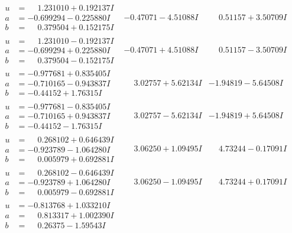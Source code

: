 \documentclass[1p]{elsarticle_modified}
\theoremstyle{definition}
\begin{document}
$$\begin{array}{c|c|c}
\begin{aligned}
u &= \phantom{-}1.231010 + 0.192137 I \\
a &= -0.699294 - 0.225880 I \\
b &= \phantom{-}0.379504 + 0.152175 I\end{aligned}
 & -0.47071 - 4.51088 I & \phantom{-}0.51157 + 3.50709 I \\ \hline\begin{aligned}
u &= \phantom{-}1.231010 - 0.192137 I \\
a &= -0.699294 + 0.225880 I \\
b &= \phantom{-}0.379504 - 0.152175 I\end{aligned}
 & -0.47071 + 4.51088 I & \phantom{-}0.51157 - 3.50709 I \\ \hline\begin{aligned}
u &= -0.977681 + 0.835405 I \\
a &= -0.710165 - 0.943837 I \\
b &= -0.44152 + 1.76315 I\end{aligned}
 & \phantom{-}3.02757 + 5.62134 I & -1.94819 - 5.64508 I \\ \hline\begin{aligned}
u &= -0.977681 - 0.835405 I \\
a &= -0.710165 + 0.943837 I \\
b &= -0.44152 - 1.76315 I\end{aligned}
 & \phantom{-}3.02757 - 5.62134 I & -1.94819 + 5.64508 I \\ \hline\begin{aligned}
u &= \phantom{-}0.268102 + 0.646439 I \\
a &= -0.923789 - 1.064280 I \\
b &= \phantom{-}0.005979 + 0.692881 I\end{aligned}
 & \phantom{-}3.06250 + 1.09495 I & \phantom{-}4.73244 - 0.17091 I \\ \hline\begin{aligned}
u &= \phantom{-}0.268102 - 0.646439 I \\
a &= -0.923789 + 1.064280 I \\
b &= \phantom{-}0.005979 - 0.692881 I\end{aligned}
 & \phantom{-}3.06250 - 1.09495 I & \phantom{-}4.73244 + 0.17091 I \\ \hline\begin{aligned}
u &= -0.813768 + 1.033210 I \\
a &= \phantom{-}0.813317 + 1.002390 I \\
b &= \phantom{-}0.26375 - 1.59543 I\end{aligned}

\end{array}$$
\end{document}
